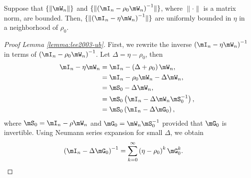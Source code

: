 \begin{lemma}\label{lemma:lee2003-ub}
Suppose that $\{\lVert \mW_n\rVert\}$ and $\{\lVert \left(\mI_n - \rho_0\mW_n\right)^{-1}\rVert\}$, where $\lVert \cdot \rVert$ is a matrix norm, are bounded. Then, $\{\lVert \left(\mI_n - \eta\mW_n\right)^{-1}\rVert\}$ are uniformly bounded in $\eta$ in a neighborhood of $\rho_0$.
\end{lemma}

\begin{proof}[Proof Lemma \ref{lemma:lee2003-ub}]
First, we rewrite the inverse $\left(\mI_n - \eta\mW_n\right)^{-1}$ in terms of $\left(\mI_n - \rho_0\mW_n\right)^{-1}$. Let $\Delta = \eta-\rho_0$, then
\begin{equation*}
\begin{aligned}
  \mI_n - \eta\mW_n  & = \mI_n - \left(\Delta + \rho_0\right)\mW_n, \\
                     & = \mI_n - \rho_0\mW_n - \Delta \mW_n, \\
                     & = \mS_{0} - \Delta \mW_n, \\
                     & = \mS_{0}\left(\mI_n - \Delta \mW_n\mS_{0}^{-1}\right), \\
                     & = \mS_{0}\left(\mI_n - \Delta \mG_0\right),
  \end{aligned}
\end{equation*}
%
where $\mS_{0} =  \mI_n - \rho\mW_n$ and $\mG_0 = \mW_n\mS_0^{-1}$ provided that $\mG_0$ is invertible.
Using Neumann series expansion for small $\Delta$, we obtain
\begin{equation*}
\begin{aligned}
  \left(\mI_n - \Delta \mG_0\right)^{-1} & = \sum_{k = 0}^{\infty}\left(\eta-\rho_0\right)^k\mG_0^k.
\end{aligned}
\end{equation*}


\end{proof}
